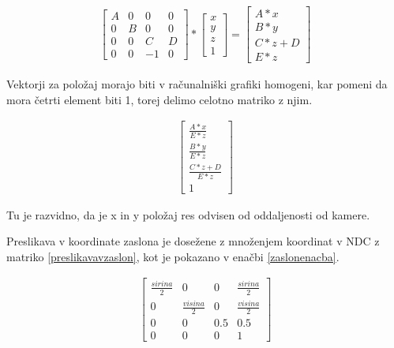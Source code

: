 \documentclass[a4paper, 12pt]{book}
\begin{document}
\begin{align}
\begin{bmatrix}
A & 0 & 0 & 0 \\ 
0 & B & 0 & 0 \\ 
0 & 0 & C & D \\ 
0 & 0 & -1 & 0
\end{bmatrix}
*
\begin{bmatrix}
x \\ y \\ z \\ 1
\end{bmatrix}	
=
\begin{bmatrix}
A*x \\
B*y \\
C*z+D \\
E*z
\end{bmatrix}
\label{perspectivecalc}
\end{align}

Vektorji za položaj morajo biti v računalniški grafiki homogeni, kar pomeni da mora četrti element biti 1, torej delimo celotno matriko z njim.

\begin{align}
\begin{bmatrix}
\frac{A*x}{E*z} \\ 
\frac{B*y}{E*z} \\
\frac{C*z+D}{E*z} \\
1
\end{bmatrix}
\label{perspectivehomogenous}
\end{align}

Tu je razvidno, da je x in y položaj res odvisen od oddaljenosti od kamere.

Preslikava v koordinate zaslona je dosežene z množenjem koordinat v NDC z matriko \ref{preslikavavzaslon}, kot je pokazano v enačbi \ref{zaslonenacba}.

\begin{align}
\begin{bmatrix}
\frac{sirina}{2} & 0 & 0 & \frac{sirina}{2}\\ 
0 & \frac{visina}{2} & 0 & \frac{visina}{2}\\ 
0 & 0 & 0.5 & 0.5 \\ 
0 & 0 & 0 & 1
\end{bmatrix}
\label{preslikavavzaslon}
\end{align}
\end{document}
